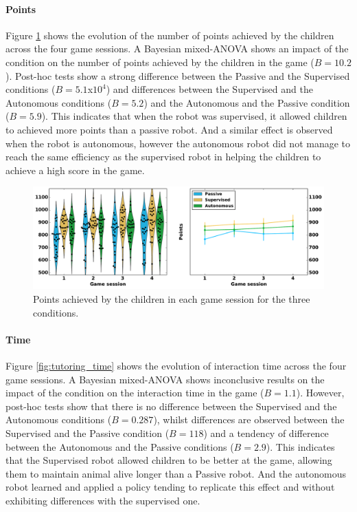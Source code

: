 \paragraph{Points}

Figure \ref{fig:tutoring_points} shows the evolution of the number of points achieved by the children across the four game sessions. A Bayesian mixed-ANOVA shows an impact of the condition on the number of points achieved by the children in the game ($B=10.2$). Post-hoc tests show a strong difference between the Passive and the Supervised conditions ($B=5.1$x$10^4$) and differences between the Supervised and the Autonomous conditions ($B=5.2$) and the Autonomous and the Passive condition ($B=5.9$). This indicates that when the robot was supervised, it allowed children to achieved more points than a  passive robot. And a similar effect is observed when the robot is autonomous, however the autonomous robot did not manage to reach the same efficiency as the supervised robot in helping the children to achieve a high score in the game.

\begin{figure}[ht]
	\includegraphics[width=1\linewidth]{points.pdf}
	\centering
	\caption{Points achieved by the children in each game session for the three conditions.}
	\label{fig:tutoring_points}
\end{figure}

\paragraph{Time}

Figure \ref{fig:tutoring_time} shows the evolution of interaction time across the four game sessions. A Bayesian mixed-ANOVA shows inconclusive results on the impact of the condition on the interaction time in the game ($B=1.1$). However, post-hoc tests show that there is no difference between the Supervised and the Autonomous conditions ($B=0.287$), whilst differences are observed between the Supervised and the Passive condition ($B=118$) and a tendency of difference between the Autonomous and the Passive conditions ($B=2.9$). This indicates that the Supervised robot allowed children to be better at the game, allowing them to maintain animal alive longer than a Passive robot. And the autonomous robot learned and applied a policy tending to replicate this effect and without exhibiting differences with the supervised one.

